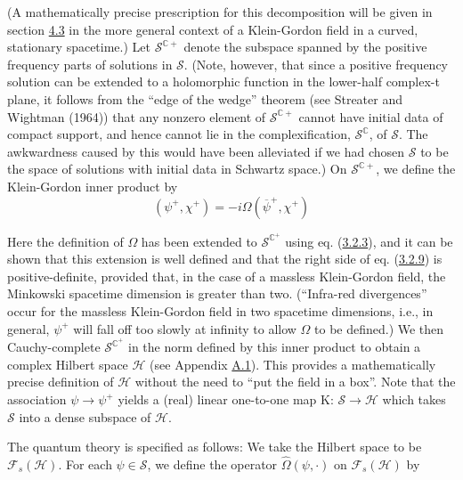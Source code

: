 \documentclass[11pt,a4paper]{article}
\begin{document}
(A mathematically precise prescription for this decomposition will be given in section \hyperlink{sec:4.3}{4.3} in the more general context of a Klein-Gordon field in a curved, stationary spacetime.) Let \(\mathcal{S}^{\mathbb{C}+}\) denote the subspace spanned by the positive frequency parts of solutions in \(\mathcal{S}\). (Note, however, that since a positive frequency solution can be extended to a holomorphic function in the lower-half complex-t plane, it follows from the ``edge of the wedge'' theorem (see Streater and Wightman (1964)) that any nonzero element of \(\mathcal{S}^{\mathbb{C}+}\) cannot have initial data of compact support, and hence cannot lie in the complexification, \(\mathcal{S}^{\mathbb{C}}\), of \(\mathcal{S}\). The awkwardness caused by this would have been alleviated if we had chosen \(\mathcal{S}\) to be the space of solutions with initial data in Schwartz space.) On \(\mathcal{S}^{\mathbb{C}+}\), we define the Klein-Gordon inner product by
\begin{equation*}
(\psi^+, \chi^+) = -i\Omega(\overline{\psi}^+, \chi^+) \tag{3.2.9}\label{eq:3.2.9}
\end{equation*}

Here the definition of \(\Omega\) has been extended to \(\mathcal{S}^{\mathbb{C}^+}\) using eq. (\hyperref[eq:3.2.3]{3.2.3}), and it can be shown that this extension is well defined and that the right side of eq. (\hyperref[eq:3.2.9]{3.2.9}) is positive-definite, provided that, in the case of a massless Klein-Gordon field, the Minkowski spacetime dimension is greater than two. (``Infra-red divergences'' occur for the massless Klein-Gordon field in two spacetime dimensions, i.e., in general, \(\psi^+\) will fall off too slowly at infinity to allow \(\Omega\) to be defined.) We then Cauchy-complete \(\mathcal{S}^{\mathbb{C}^+}\) in the norm defined by this inner product to obtain a complex Hilbert space \(\mathcal{H}\) (see Appendix \hyperlink{sec:A.1}{A.1}). This provides a mathematically precise definition of \(\mathcal{H}\) without the need to ``put the field in a box''. Note that the association \(\psi \to \psi^+\) yields a (real) linear one-to-one map K: \(\mathcal{S} \to \mathcal{H}\) which takes \(\mathcal{S}\) into a dense subspace of \(\mathcal{H}\).

The quantum theory is specified as follows: We take the Hilbert space to be \(\mathcal{F}_s(\mathcal{H})\). For each \(\psi \in \mathcal{S}\), we define the operator \(\hat{\Omega}(\psi,\cdot)\) on \(\mathcal{F}_s(\mathcal{H})\) by
\end{document}
